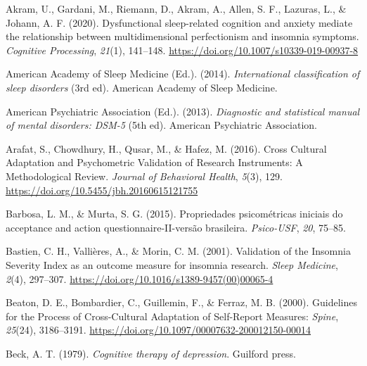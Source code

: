 \documentclass[
  ,doc,11pt, twoside,floatsintext]{apa6}
\newlength{\cslhangindent}
\newlength{\cslentryspacingunit} %
\newenvironment{CSLReferences}[2] %
 {%
  \setlength{\parindent}{0pt}
  \ifodd #1
  \let\oldpar\par
  \def\par{\hangindent=\cslhangindent\oldpar}
  \fi
  \setlength{\parskip}{#2\cslentryspacingunit}
 }%
 {}
\begin{document}
\setlength{\parindent}{-0.5in}
\setlength{\leftskip}{0.5in}

\hypertarget{refs}{}
\begin{CSLReferences}{1}{0}
\leavevmode{}%
Akram, U., Gardani, M., Riemann, D., Akram, A., Allen, S. F., Lazuras, L., \& Johann, A. F. (2020). Dysfunctional sleep-related cognition and anxiety mediate the relationship between multidimensional perfectionism and insomnia symptoms. \emph{Cognitive Processing}, \emph{21}(1), 141--148. \url{https://doi.org/10.1007/s10339-019-00937-8}

\leavevmode{}%
American Academy of Sleep Medicine (Ed.). (2014). \emph{International classification of sleep disorders} (3rd ed). {American Academy of Sleep Medicine}.

\leavevmode{}%
American Psychiatric Association (Ed.). (2013). \emph{Diagnostic and statistical manual of mental disorders: {DSM}-5} (5th ed). {American Psychiatric Association}.

\leavevmode{}%
Arafat, S., Chowdhury, H., Qusar, M., \& Hafez, M. (2016). Cross {Cultural Adaptation} and {Psychometric Validation} of {Research Instruments}: A {Methodological Review}. \emph{Journal of Behavioral Health}, \emph{5}(3), 129. \url{https://doi.org/10.5455/jbh.20160615121755}

\leavevmode{}%
Barbosa, L. M., \& Murta, S. G. (2015). Propriedades psicométricas iniciais do acceptance and action questionnaire-II-versão brasileira. \emph{Psico-USF}, \emph{20}, 75--85.

\leavevmode{}%
Bastien, C. H., Vallières, A., \& Morin, C. M. (2001). Validation of the {Insomnia Severity Index} as an outcome measure for insomnia research. \emph{Sleep Medicine}, \emph{2}(4), 297--307. \url{https://doi.org/10.1016/s1389-9457(00)00065-4}

\leavevmode{}%
Beaton, D. E., Bombardier, C., Guillemin, F., \& Ferraz, M. B. (2000). Guidelines for the {Process} of {Cross-Cultural Adaptation} of {Self-Report Measures}: \emph{Spine}, \emph{25}(24), 3186--3191. \url{https://doi.org/10.1097/00007632-200012150-00014}

\leavevmode{}%
Beck, A. T. (1979). \emph{Cognitive therapy of depression}. Guilford press.


\end{CSLReferences}
\end{document}
